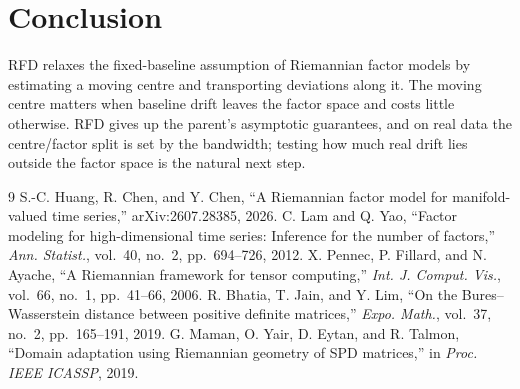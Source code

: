 \documentclass[journal]{IEEEtran}
\begin{document}
\section{Conclusion}\label{sec:conc}
RFD relaxes the fixed-baseline assumption of Riemannian factor models by
estimating a moving centre and transporting deviations along it. The
moving centre matters when baseline drift leaves the factor space and
costs little otherwise. RFD gives up the parent's asymptotic guarantees,
and on real data the centre/factor split is set by the bandwidth; testing
how much real drift lies outside the factor space is the natural next step.


\begin{thebibliography}{9}
S.-C. Huang, R. Chen, and Y. Chen, ``A Riemannian factor model for
manifold-valued time series,'' arXiv:2607.28385, 2026.
C. Lam and Q. Yao, ``Factor modeling for high-dimensional time series:
Inference for the number of factors,'' \emph{Ann. Statist.}, vol.~40,
no.~2, pp.~694--726, 2012.
X. Pennec, P. Fillard, and N. Ayache, ``A Riemannian framework for tensor
computing,'' \emph{Int. J. Comput. Vis.}, vol.~66, no.~1, pp.~41--66, 2006.
R. Bhatia, T. Jain, and Y. Lim, ``On the Bures--Wasserstein distance between
positive definite matrices,'' \emph{Expo. Math.}, vol.~37, no.~2,
pp.~165--191, 2019.
G. Maman, O. Yair, D. Eytan, and R. Talmon, ``Domain adaptation using
Riemannian geometry of SPD matrices,'' in \emph{Proc. IEEE ICASSP}, 2019.
\end{thebibliography}
\end{document}

